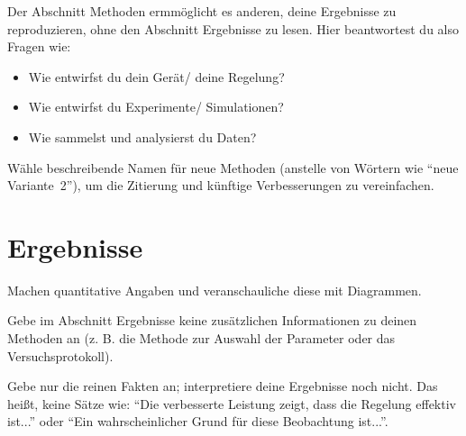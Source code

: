\documentclass[a4paper, 11pt]{IEEEtran}
\begin{document}
Der Abschnitt Methoden ermmöglicht es anderen, deine Ergebnisse zu reproduzieren, ohne den Abschnitt Ergebnisse zu lesen. 
Hier beantwortest du also Fragen wie:

\begin{itemize}

\item Wie entwirfst du dein Gerät/ deine Regelung? %

\item Wie entwirfst du Experimente/ Simulationen? 

\item Wie sammelst und analysierst du Daten? %
\end{itemize}

Wähle beschreibende Namen für neue Methoden (anstelle von Wörtern wie ``neue Variante~2''), um die Zitierung und künftige Verbesserungen zu vereinfachen.




 \section{Ergebnisse}
 Machen quantitative Angaben und veranschauliche diese mit Diagrammen. 
  
 Gebe im Abschnitt Ergebnisse keine zusätzlichen Informationen zu deinen Methoden an (z. B. die Methode zur Auswahl der Parameter oder das Versuchsprotokoll). 
 
 Gebe nur die reinen Fakten an; interpretiere deine Ergebnisse noch nicht. Das heißt, keine Sätze wie: ``Die verbesserte Leistung zeigt, dass die Regelung effektiv ist...'' oder ``Ein wahrscheinlicher Grund für diese Beobachtung ist...''. 

 
\end{document}

